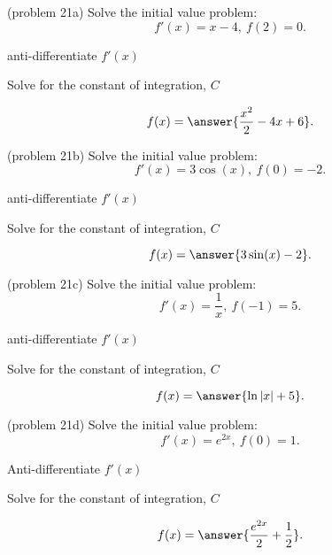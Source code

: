 \documentclass[handout]{ximera}
\begin{document}
\begin{problem}(problem 21a)
Solve the initial value problem:
\[f'(x) = x-4, \ f(2) = 0.\]
\begin{hint}
anti-differentiate $f'(x)$
\end{hint}
\begin{hint}
Solve for the constant of integration, $C$
\end{hint}
\[f(x) = \answer{\frac{x^2}{2} - 4x + 6}.\]
\end{problem}

\begin{problem}(problem 21b)
Solve the initial value problem:
\[f'(x) = 3\cos(x), \ f(0) = -2.\]
\begin{hint}
anti-differentiate $f'(x)$
\end{hint}
\begin{hint}
Solve for the constant of integration, $C$
\end{hint}
\[f(x) = \answer{3\sin(x) - 2}.\]
\end{problem}

\begin{problem}(problem 21c)
Solve the initial value problem:
\[f'(x) = \frac{1}{x}, \ f(-1) = 5.\]
\begin{hint}
anti-differentiate $f'(x)$
\end{hint}
\begin{hint}
Solve for the constant of integration, $C$
\end{hint}
\[f(x) = \answer{\ln|x| + 5}.\]
\end{problem}

\begin{problem}(problem 21d)
Solve the initial value problem:
\[f'(x) = e^{2x}, \ f(0) = 1.\]
\begin{hint}
Anti-differentiate $f'(x)$
\end{hint}
\begin{hint}
Solve for the constant of integration, $C$
\end{hint}
\[f(x) = \answer{\frac{e^{2x}}{2} + \frac12}.\]
\end{problem}
\end{document}
